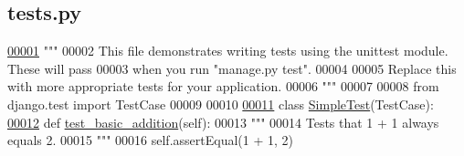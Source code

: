 \hypertarget{tests_8py_source}{}\subsection{tests.\+py}
\label{tests_8py_source}

\begin{DoxyCode}
\hypertarget{tests_8py_source_l00001}{}\hyperlink{namespaceBuilding_1_1tests}{00001} \textcolor{stringliteral}{"""}
00002 \textcolor{stringliteral}{This file demonstrates writing tests using the unittest module. These will pass}
00003 \textcolor{stringliteral}{when you run "manage.py test".}
00004 \textcolor{stringliteral}{}
00005 \textcolor{stringliteral}{Replace this with more appropriate tests for your application.}
00006 \textcolor{stringliteral}{"""}
00007 
00008 \textcolor{keyword}{from} django.test \textcolor{keyword}{import} TestCase
00009 
00010 
\hypertarget{tests_8py_source_l00011}{}\hyperlink{classBuilding_1_1tests_1_1SimpleTest}{00011} \textcolor{keyword}{class }\hyperlink{classBuilding_1_1tests_1_1SimpleTest}{SimpleTest}(TestCase):
\hypertarget{tests_8py_source_l00012}{}\hyperlink{classBuilding_1_1tests_1_1SimpleTest_a08b46df0d20de8cbd1dd87605ab2d579}{00012}     \textcolor{keyword}{def }\hyperlink{classBuilding_1_1tests_1_1SimpleTest_a08b46df0d20de8cbd1dd87605ab2d579}{test\_basic\_addition}(self):
00013         \textcolor{stringliteral}{"""}
00014 \textcolor{stringliteral}{        Tests that 1 + 1 always equals 2.}
00015 \textcolor{stringliteral}{        """}
00016         self.assertEqual(1 + 1, 2)
\end{DoxyCode}
